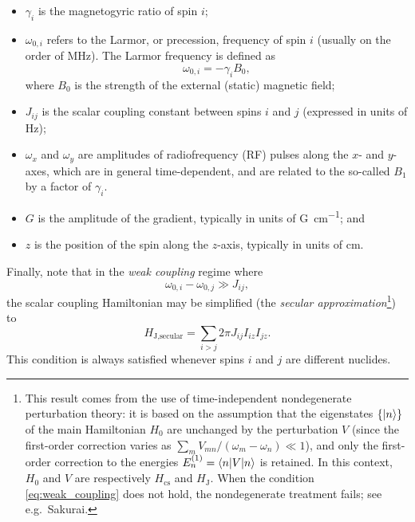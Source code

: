 \begin{itemize}
    \item $\gamma_i$ is the magnetogyric ratio of spin $i$;
    \item $\omega_{0,i}$ refers to the Larmor, or precession, frequency of spin $i$ (usually on the order of \unit{MHz}). The Larmor frequency is defined as
        \begin{equation}
            \label{eq:larmor_frequency}
            \omega_{0,i} = -\gamma_i B_0,
        \end{equation}
        where $B_0$ is the strength of the external (static) magnetic field;
    \item $J_{ij}$ is the scalar coupling constant between spins $i$ and $j$ (expressed in units of \unit{Hz});
    \item $\omega_x$ and $\omega_y$ are amplitudes of radiofrequency (RF) pulses along the $x$- and $y$-axes, which are in general time-dependent, and are related to the so-called $B_1$ by a factor of $\gamma_i$.
    \item $G$ is the amplitude of the gradient, typically in units of \unit{G\per\cm}; and
    \item $z$ is the position of the spin along the $z$-axis, typically in units of \unit{\cm}.
\end{itemize}

Finally, note that in the \textit{weak coupling} regime where
\begin{equation}
    \omega_{0,i} - \omega_{0,j} \gg J_{ij}, \label{eq:weak_coupling}
\end{equation}
the scalar coupling Hamiltonian may be simplified (the \textit{secular approximation}\footnote{This result comes from the use of time-independent nondegenerate perturbation theory: it is based on the assumption that the eigenstates $\{\ket{n}\}$ of the main Hamiltonian $H_0$ are unchanged by the perturbation $V$ (since the first-order correction varies as $\sum_m V_{mn}/(\omega_m - \omega_n) \ll 1$), and only the first-order correction to the energies $E_n^{(1)} = \braket{n | V | n}$ is retained. In this context, $H_0$ and $V$ are respectively $H_\text{cs}$ and $H_\text{J}$. When the condition \cref{eq:weak_coupling} does not hold, the nondegenerate treatment fails; see e.g.\ Sakurai\autocite{Sakurai2021}.}) to
\begin{equation}
    H_\text{J,secular} = \sum_{i > j} 2\pi J_{ij} I_{iz}I_{jz} \label{eq:h_j_secular}.
\end{equation}
This condition is always satisfied whenever spins $i$ and $j$ are different nuclides.

